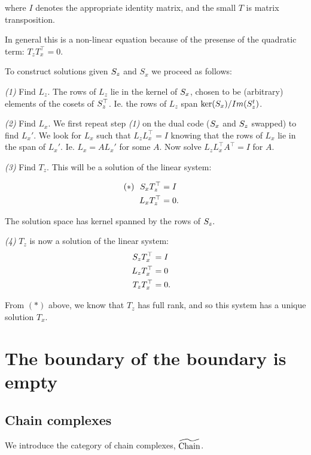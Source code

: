 where $I$ denotes the appropriate
identity matrix, and the small $T$
is matrix transposition.

In general this is a non-linear
equation because of the presense
of the quadratic term: $T_zT_x^\top=0.$

To construct solutions given
$\S_z$ and $S_x$ we proceed as follows:

{\it (1)} 
Find $L_z$.
The rows of $L_z$ lie in the kernel of $\S_x$,
chosen to be (arbitrary) elements of the cosets
of $\S_z^\top$. Ie. the rows of $L_z$ span $\ker(\S_x)/Im(\S_z^t)$.

{\it (2)}
Find $L_x$.
We first repeat step {\it (1)} on the dual code ($\S_x$ and $\S_z$
swapped) to find $L_x'$.
We look for $L_x$ such that $L_zL_x^\top=I$
knowing that the rows of $L_x$ lie in the
span of $L_x'.$ Ie.  $ L_x = AL_x'$ for some $A$.
Now solve $L_zL_x^\top A^\top = I$ for $A.$

{\it (3)}
Find $T_z$. This will be a solution
of the linear system:

\begin{align*}
    (*)\ \ \S_x T_z^\top &= I \cr
    L_x T_z^\top &= 0.\cr
\end{align*}

The solution space has kernel spanned by
the rows of $\S_z.$

{\it (4)}
$T_z$ is now a solution of the linear system:
\begin{align*}
    \S_z T_x^\top &= I \cr
    L_z T_x^\top &= 0\cr
    T_z T_x^\top &= 0.\cr
\end{align*}

From $(*)$ above, we know that $T_z$ has
full rank, and so this system has a unique
solution $T_x.$




%
%


\section{The boundary of the boundary is empty}


\subsection{Chain complexes}

We introduce the category of chain complexes, $\Chain$.

